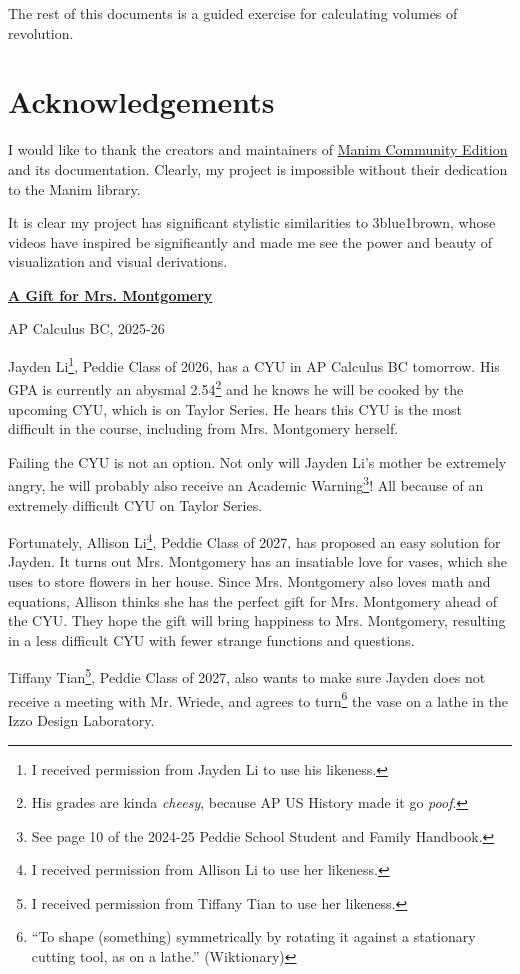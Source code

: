 \documentclass{article}
\begin{document}
The rest of this documents is a guided exercise for calculating volumes of revolution.

\section{Acknowledgements}

I would like to thank the creators and maintainers of \href{https://www.manim.community/}{Manim Community Edition} and its documentation. Clearly, my project is impossible without their dedication to the Manim library.

It is clear my project has significant stylistic similarities to 3blue1brown, whose videos have inspired be significantly and made me see the power and beauty of visualization and visual derivations.

\newpage

\begin{center}
	\textbf{\underline{A Gift for Mrs. Montgomery}}

	AP Calculus BC, 2025-26
\end{center}

Jayden Li\footnote{I received permission from Jayden Li to use his likeness.}, Peddie Class of 2026, has a CYU in AP Calculus BC tomorrow. His GPA is currently an abysmal 2.54\footnote{His grades are kinda \textit{cheesy}, because AP US History made it go \textit{poof}.} and he knows he will be cooked by the upcoming CYU, which is on Taylor Series. He hears this CYU is the most difficult in the course, including from Mrs. Montgomery herself.

Failing the CYU is not an option. Not only will Jayden Li's mother be extremely angry, he will probably also receive an Academic Warning\footnote{See page 10 of the 2024-25 Peddie School Student and Family Handbook.}! All because of an extremely difficult CYU on Taylor Series.

Fortunately, Allison Li\footnote{I received permission from Allison Li to use her likeness.}, Peddie Class of 2027, has proposed an easy solution for Jayden. It turns out Mrs. Montgomery has an insatiable love for vases, which she uses to store flowers in her house. Since Mrs. Montgomery also loves math and equations, Allison thinks she has the perfect gift for Mrs. Montgomery ahead of the CYU. They hope the gift will bring happiness to Mrs. Montgomery, resulting in a less difficult CYU with fewer strange functions and questions.

Tiffany Tian\footnote{I received permission from Tiffany Tian to use her likeness.}, Peddie Class of 2027, also wants to make sure Jayden does not receive a meeting with Mr. Wriede, and agrees to turn\footnote{``To shape (something) symmetrically by rotating it against a stationary cutting tool, as on a lathe.'' (Wiktionary)} the vase on a lathe in the Izzo Design Laboratory.
\end{document}
